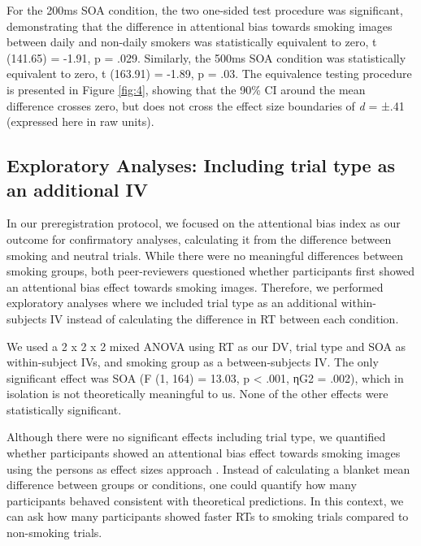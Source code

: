 \documentclass[empirical, authordate]{jote-new-article}
\begin{document}
For the 200ms SOA condition, the two one-sided test procedure was significant, demonstrating that the difference in attentional bias towards smoking images between daily and non-daily smokers was statistically equivalent to zero, t (141.65) = -1.91, p = .029. Similarly, the 500ms SOA condition was statistically equivalent to zero, t (163.91) = -1.89, p = .03. The equivalence testing procedure is presented in Figure \ref{fig:4}, showing that the 90\% CI around the mean difference crosses zero, but does not cross the effect size boundaries of \emph{d} = ±.41 (expressed here in raw units).






\subsection{Exploratory Analyses: Including trial type as an additional IV}

In our preregistration protocol, we focused on the attentional bias index as our outcome for confirmatory analyses, calculating it from the difference between smoking and neutral trials. While there were no meaningful differences between smoking groups, both peer-reviewers questioned whether participants first showed an attentional bias effect towards smoking images. Therefore, we performed exploratory analyses where we included trial type as an additional within-subjects IV instead of calculating the difference in RT between each condition.

We used a 2 x 2 x 2 mixed ANOVA using RT as our DV, trial type and SOA as within-subject IVs, and smoking group as a between-subjects IV. The only significant effect was SOA (F (1, 164) = 13.03, p < .001, ηG2 = .002), which in isolation is not theoretically meaningful to us. None of the other effects were statistically significant.

Although there were no significant effects including trial type, we quantified whether participants showed an attentional bias effect towards smoking images using the persons as effect sizes approach \parencite{Grice2020}. Instead of calculating a blanket mean difference between groups or conditions, one could quantify how many participants behaved consistent with theoretical predictions. In this context, we can ask how many participants showed faster RTs to smoking trials compared to non-smoking trials.
\end{document}
